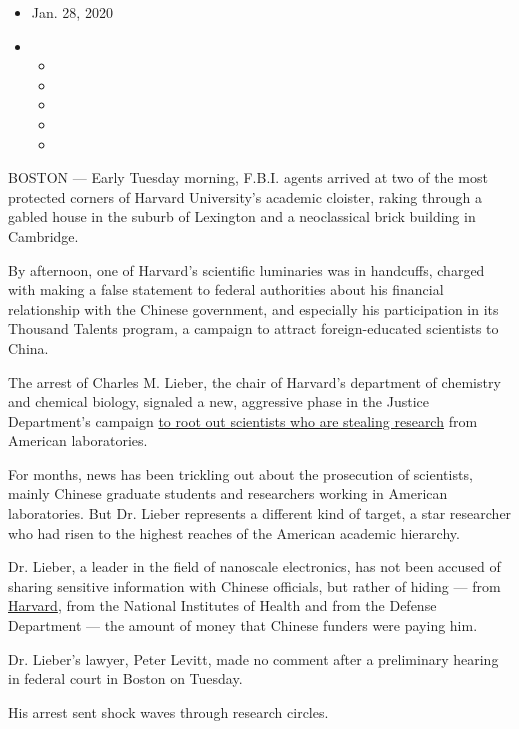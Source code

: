 \begin{itemize}
\item
  Jan. 28, 2020
\item
  \begin{itemize}
  \item
  \item
  \item
  \item
  \item
  \end{itemize}
\end{itemize}

BOSTON --- Early Tuesday morning, F.B.I. agents arrived at two of the
most protected corners of Harvard University's academic cloister, raking
through a gabled house in the suburb of Lexington and a neoclassical
brick building in Cambridge.

By afternoon, one of Harvard's scientific luminaries was in handcuffs,
charged with making a false statement to federal authorities about his
financial relationship with the Chinese government, and especially his
participation in its Thousand Talents program, a campaign to attract
foreign-educated scientists to China.

The arrest of Charles M. Lieber, the chair of Harvard's department of
chemistry and chemical biology, signaled a new, aggressive phase in the
Justice Department's campaign
\href{https://www.nytimes.com/2019/11/04/health/china-nih-scientists.html}{to
root out scientists who are stealing research} from American
laboratories.

For months, news has been trickling out about the prosecution of
scientists, mainly Chinese graduate students and researchers working in
American laboratories. But Dr. Lieber represents a different kind of
target, a star researcher who had risen to the highest reaches of the
American academic hierarchy.

Dr. Lieber, a leader in the field of nanoscale electronics, has not been
accused of sharing sensitive information with Chinese officials, but
rather of hiding --- from
\href{https://www.nytimes.com/2020/07/15/us/steven-pinker-harvard.html}{Harvard},
from the National Institutes of Health and from the Defense Department
--- the amount of money that Chinese funders were paying him.

Dr. Lieber's lawyer, Peter Levitt, made no comment after a preliminary
hearing in federal court in Boston on Tuesday.

His arrest sent shock waves through research circles.

